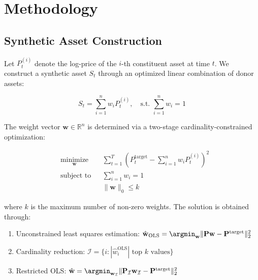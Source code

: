 


\section{Methodology}
\subsection{Synthetic Asset Construction}
Let $P_t^{(i)}$ denote the log-price of the $i$-th constituent asset at time $t$. We construct a synthetic asset $S_t$ through an optimized linear combination of donor assets:

\begin{equation}
S_t = \sum_{i=1}^n w_i P_t^{(i)},\quad \text{s.t. } \sum_{i=1}^n w_i = 1
\end{equation}

The weight vector $\mathbf{w} \in \mathbb{R}^n$ is determined via a two-stage cardinality-constrained optimization:

\begin{equation}
\begin{aligned}
& \underset{\mathbf{w}}{\text{minimize}}
& & \sum_{t=1}^T \left(P_t^{\text{target}} - \sum_{i=1}^n w_i P_t^{(i)}\right)^2 \\
& \text{subject to}
& & \sum_{i=1}^n w_i = 1 \\
& & & \|\mathbf{w}\|_0 \leq k
\end{aligned}
\end{equation}

where $k$ is the maximum number of non-zero weights. The solution is obtained through:
\begin{enumerate}
\item Unconstrained least squares estimation: $\hat{\mathbf{w}}_{\text{OLS}} = \argmin_{\mathbf{w}} \|\mathbf{P}\mathbf{w} - \mathbf{P}^{\text{target}}\|_2^2$
\item Cardinality reduction: $\mathcal{I} = \{i : |\hat{w}_i^{\text{OLS}}| \text{ top } k \text{ values}\}$
\item Restricted OLS: $\hat{\mathbf{w}} = \argmin_{\mathbf{w}_{\mathcal{I}}} \|\mathbf{P}_{\mathcal{I}}\mathbf{w}_{\mathcal{I}} - \mathbf{P}^{\text{target}}\|_2^2$
\end{enumerate}

